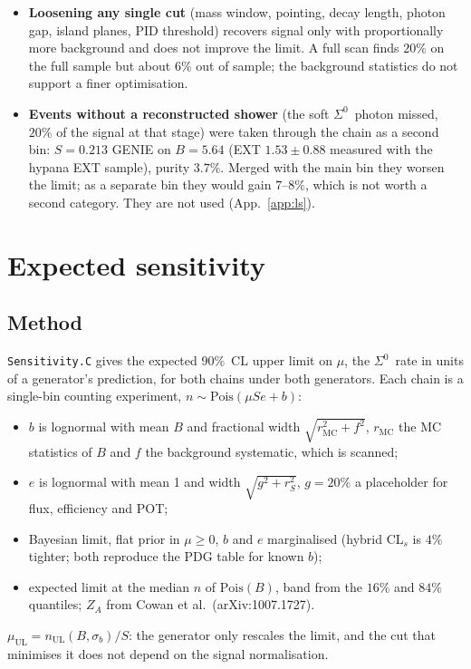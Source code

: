 \documentclass[11pt,a4paper]{article}
\newcommand{\Szero}{\ensuremath{\Sigma^{0}}}
\newcommand{\muUL}{\ensuremath{\mu_{\mathrm{UL}}}}
\begin{document}
\begin{itemize}
        $n_{\mathrm{sh}}\leq2$ or $3$, all within $1\%$). Cross-validated by parity, a choice
        made on one half is worse than the operating point on the other, so the scan resolves
        nothing finer than about $10\%$; the final background is 12 raw events and each step
        moves 1--4 of them (App.~\ref{app:lslast}).
  \item \textbf{Loosening any single cut} (mass window, pointing, decay length, photon gap,
        island planes, PID threshold) recovers signal only with proportionally more
        background and does not improve the limit. A full scan finds $20\%$ on the full
        sample but about $6\%$ out of sample; the background statistics do not support a
        finer optimisation.
  \item \textbf{Events without a reconstructed shower} (the soft \Szero\ photon missed, $20\%$
        of the signal at that stage) were taken through the chain as a second bin: $S=0.213$
        GENIE on $B=5.64$ (EXT $1.53\pm0.88$ measured with the hypana EXT sample), purity
        $3.7\%$. Merged with the main bin they worsen the limit; as a separate bin they would
        gain $7$--$8\%$, which is not worth a second category. They are not used
        (App.~\ref{app:ls}).
\end{itemize}

\section{Expected sensitivity}
\label{sec:sensitivity}

\subsection{Method}
\texttt{Sensitivity.C} gives the expected 90\%~CL upper limit on $\mu$, the \Szero\ rate
in units of a generator's prediction, for both chains under both generators. Each chain
is a single-bin counting experiment, $n\sim\mathrm{Pois}(\mu S e + b)$:
\begin{itemize}
  \item $b$ is lognormal with mean $B$ and fractional width $\sqrt{r_{\mathrm{MC}}^2+f^2}$,
        $r_{\mathrm{MC}}$ the MC statistics of $B$ and $f$ the background systematic,
        which is scanned;
  \item $e$ is lognormal with mean 1 and width $\sqrt{g^2+r_S^2}$, $g=20\%$ a placeholder
        for flux, efficiency and POT;
  \item Bayesian limit, flat prior in $\mu\geq0$, $b$ and $e$ marginalised (hybrid CL$_s$
        is $4\%$ tighter; both reproduce the PDG table for known $b$);
  \item expected limit at the median $n$ of $\mathrm{Pois}(B)$, band from the $16\%$ and
        $84\%$ quantiles; $Z_A$ from Cowan et al.\ (arXiv:1007.1727).
\end{itemize}
$\muUL=n_{\mathrm{UL}}(B,\sigma_b)/S$: the generator only rescales the limit, and the cut
that minimises it does not depend on the signal normalisation.
\end{document}
